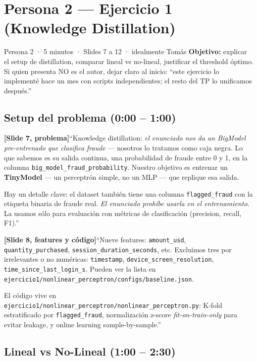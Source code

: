 \documentclass[11pt,a4paper]{article}
\newcommand{\code}[1]{\texttt{\textcolor{accent}{#1}}}
\newcommand{\file}[1]{\texttt{\small #1}}
\newcommand{\slidenum}[1]{\textcolor{accent}{\textbf{[Slide #1]}}}
\newcommand{\timing}[1]{\textcolor{muted}{\small (#1)}}
\newcommand{\enunciado}[1]{\textcolor{warn}{\textit{#1}}}
\begin{document}
\section{Persona 2 — Ejercicio 1 (Knowledge Distillation)}\label{sec:p2}

\begin{persona}{Persona 2 · 5 minutos · Slides 7 a 12 · idealmente Tomás}
\textbf{Objetivo:} explicar el setup de distillation, comparar lineal vs no-lineal, justificar el threshold óptimo. Si quien presenta NO es el autor, dejar claro al inicio: ``este ejercicio lo implementé hace un mes con scripts independientes; el resto del TP lo unificamos después.''
\end{persona}

\subsection{Setup del problema \timing{0:00 -- 1:00}}

\slidenum{7, problema}\quad ``Knowledge distillation: \enunciado{el enunciado nos da un BigModel pre-entrenado que clasifica fraude} --- nosotros lo tratamos como caja negra. Lo que sabemos es su salida continua, una probabilidad de fraude entre 0 y 1, en la columna \code{big\_model\_fraud\_probability}. Nuestro objetivo es entrenar un \textbf{TinyModel} --- un perceptrón simple, no un MLP --- que replique esa salida.

Hay un detalle clave: el dataset también tiene una columna \code{flagged\_fraud} con la etiqueta binaria de fraude real. \enunciado{El enunciado prohíbe usarla en el entrenamiento}. La usamos sólo para evaluación con métricas de clasificación (precision, recall, F1).''

\slidenum{8, features y código}\quad ``Nueve features: \code{amount\_usd}, \code{quantity\_purchased}, \code{session\_duration\_seconds}, etc. Excluimos tres por irrelevantes o no numéricas: \code{timestamp}, \code{device\_screen\_resolution}, \code{time\_since\_last\_login\_s}. Pueden ver la lista en \file{ejercicio1/nonlinear\_perceptron/configs/baseline.json}.

El código vive en \file{ejercicio1/nonlinear\_perceptron/nonlinear\_perceptron.py}: K-fold estratificado por \code{flagged\_fraud}, normalización z-score \emph{fit-on-train-only} para evitar leakage, y online learning sample-by-sample.''

\subsection{Lineal vs No-Lineal \timing{1:00 -- 2:30}}
\end{document}
